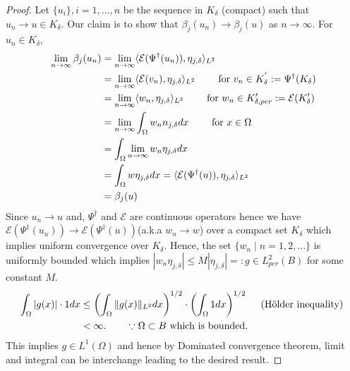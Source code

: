 \documentclass[reqno,9pt]{amsart}
\theoremstyle{plain}
\theoremstyle{definition}
\newcommand{\cal}[1]{\mathcal{#1}}
\begin{document}
\begin{proof}
    Let  $\{u_i\}, i = 1, \dots, n$ be the sequence in $K_\delta$ (compact) such that $u_n \to u \in K_\delta.$ Our claim is to show that $\beta_j(u_n) \to \beta_j(u)$ as $n \to \infty$. For $u_n \in K_\delta$,
    $$
    \begin{aligned}
        \lim_{n\to \infty}\beta_j(u_n) &= \lim_{n\to \infty} \langle\cal E(\Psi^\dag(u_n)),\eta_{j,\delta}\rangle_{L^2} \\
        &= \lim_{n \to \infty}\langle\cal E(v_n),\eta_{j,\delta}\rangle_{L^2} \text{ \qquad for } v_n \in K^{'}_\delta:= \Psi^\dag(K_\delta) \\
        &= \lim_{n \to \infty} \langle w_n, \eta_{j,\delta}\rangle_{L^2} \text{ \qquad for }w_n \in K'_{\delta, per}:= \cal E(K'_\delta) \\
        &= \lim_{n \to \infty}\int_\Omega w_n n_{j,\delta} dx \text{ \qquad for } x \in \Omega\\
        &=\int_\Omega \lim_{n \to \infty} w_n\eta_{j,\delta} dx \\
        &= \int_\Omega w\eta_{j,\delta} dx = \langle\cal E(\Psi^\dag(u)),\eta_{j,\delta}\rangle_{L^2} \\
        &= \beta_j(u)
    \end{aligned}
    $$
    Since $u_n \to u$ and, $\Psi^\dag$ and $\cal E$ are continuous operators hence we have $\cal E(\Psi^\dag(u_n)) \to \cal E(\Psi^\dag(u))$(a.k.a $w_n \to w$) over a compact set $K_\delta$ which implies uniform convergence over $K_\delta$. Hence, the set $\{w_n \mid n = 1,2,\dots\}$ is uniformly bounded which implies $|w_n\eta_{j,\delta}| \leq M |\eta_{j,\delta}| =: g \in L^2_{per}(B)$ for some constant $M$.
    $$
    \begin{aligned}
        \int_\Omega |g(x)|\cdot 1 dx &\leq \left(\int_{\Omega}\|g(x)\|_{L^2} dx \right)^{1/2}\cdot \left(\int_{\Omega} 1 dx\right)^{1/2}\text{ \quad (H\"{o}lder inequality) }\\
        &< \infty. \qquad \because \Omega \subset B \text{ which is bounded. }
    \end{aligned}
    $$
    This implies $g \in L^1(\Omega)$ and hence by Dominated convergence theorem, limit and integral can be interchange leading to the desired result. 
\end{proof}


\end{document}
